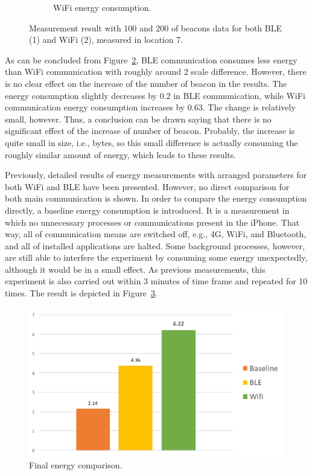 \documentclass[journal]{vgtc}                %
\begin{document}
\begin{figure}
\begin{subfigure}[b]{0.13\textwidth}
        \caption{WiFi energy consumption.}
        \label{fig:wifi-high-tp}
    \end{subfigure}
    \caption{Measurement result with 100 and 200 of beacons data for both BLE (1) and WiFi (2), measured in location 7.}
    \label{fig:high-throughput}
\end{figure}

As can be concluded from Figure~\ref{fig:high-throughput}, BLE communication consumes less energy than WiFi communication with roughly around 2 scale difference. However, there is no clear effect on the increase of the number of beacon in the results. The energy consumption slightly decreases by 0.2 in BLE communication, while WiFi communication energy consumption increases by 0.63. The change is relatively small, however. Thus, a conclusion can be drawn saying that there is no significant effect of the increase of number of beacon. Probably, the increase is quite small in size, i.e., bytes, so this small difference is actually consuming the roughly similar amount of energy, which leads to these results.

Previously, detailed results of energy measurements with arranged parameters for both WiFi and BLE have been presented. However, no direct comparison for both main communication is shown. In order to compare the energy consumption directly, a baseline energy consumption is introduced. It is a measurement in which no unnecessary processes or communications present in the iPhone. That way, all of communication means are switched off, e.g., 4G, WiFi, and Bluetooth, and all of installed applications are halted. Some background processes, however, are still able to interfere the experiment by consuming some energy unexpectedly, although it would be in a small effect. As previous measurements, this experiment is also carried out within 3 minutes of time frame and repeated for 10 times. The result is depicted in Figure~\ref{fig:baseline-ble-wifi}.

\begin{figure}
  \centering
    \includegraphics[width=.5\textwidth]{baseline-ble-wifi}
  \caption{Final energy comparison.}
  \label{fig:baseline-ble-wifi}
\end{figure}
\end{document}
